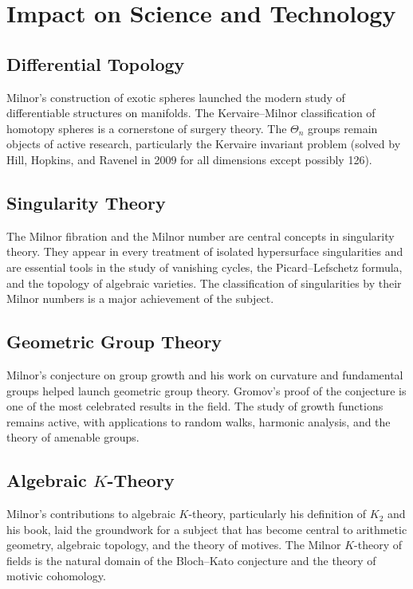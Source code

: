 \section{Impact on Science and Technology}

\subsection{Differential Topology}

Milnor's construction of exotic spheres launched the modern study of differentiable structures on manifolds. The Kervaire--Milnor classification of homotopy spheres is a cornerstone of surgery theory. The \(\Theta_n\) groups remain objects of active research, particularly the Kervaire invariant problem (solved by Hill, Hopkins, and Ravenel in 2009 for all dimensions except possibly 126).

\subsection{Singularity Theory}

The Milnor fibration and the Milnor number are central concepts in singularity theory. They appear in every treatment of isolated hypersurface singularities and are essential tools in the study of vanishing cycles, the Picard--Lefschetz formula, and the topology of algebraic varieties. The classification of singularities by their Milnor numbers is a major achievement of the subject.

\subsection{Geometric Group Theory}

Milnor's conjecture on group growth and his work on curvature and fundamental groups helped launch geometric group theory. Gromov's proof of the conjecture is one of the most celebrated results in the field. The study of growth functions remains active, with applications to random walks, harmonic analysis, and the theory of amenable groups.

\subsection{Algebraic \texorpdfstring{\(K\)}{K}-Theory}

Milnor's contributions to algebraic \(K\)-theory, particularly his definition of \(K_2\) and his book, laid the groundwork for a subject that has become central to arithmetic geometry, algebraic topology, and the theory of motives. The Milnor \(K\)-theory of fields is the natural domain of the Bloch--Kato conjecture and the theory of motivic cohomology.

